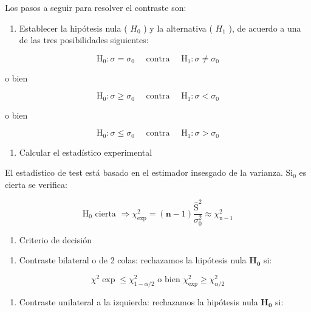 \documentclass[
]{article}
\providecommand{\tightlist}{%
  \setlength{\itemsep}{0pt}\setlength{\parskip}{0pt}}
\begin{document}
Los pasos a seguir para resolver el contraste son:

\begin{enumerate}
\def\labelenumi{\arabic{enumi})}
\tightlist
\item
  Establecer la hipótesis nula ( \(H_{0}\) ) y la alternativa ( \(H_{1}\) ), de acuerdo a una de las tres posibilidades siguientes:
\end{enumerate}

\[
\mathrm{H}_{0}: \sigma=\sigma_{0} \quad \text { contra } \quad \mathrm{H}_{1}: \sigma \neq \sigma_{0}
\]

o bien

\[
\mathrm{H}_{0}: \sigma \geq \sigma_{0} \quad \text { contra } \quad \mathrm{H}_{1}: \sigma<\sigma_{0}
\]

o bien

\[
\mathrm{H}_{0}: \sigma \leq \sigma_{0} \quad \text { contra } \quad \mathrm{H}_{1}: \sigma>\sigma_{0}
\]

\begin{enumerate}
\def\labelenumi{\arabic{enumi})}
\setcounter{enumi}{1}
\tightlist
\item
  Calcular el estadístico experimental
\end{enumerate}

El estadístico de test está basado en el estimador insesgado de la varianza. \(\mathrm{Si}_{0}\) es cierta se verifica:

\[
\mathrm{H}_{0} \text { cierta } \Rightarrow \chi_{\exp }^{2}=(\mathbf{n}-1) \frac{\hat{\mathrm{S}}^{2}}{\sigma_{0}^{2}} \approx \chi_{\mathrm{n}-1}^{2}
\]

\begin{enumerate}
\def\labelenumi{\arabic{enumi})}
\setcounter{enumi}{2}
\tightlist
\item
  Criterio de decisión
\end{enumerate}

\begin{enumerate}
\def\labelenumi{\alph{enumi})}
\tightlist
\item
  Contraste bilateral o de 2 colas: rechazamos la hipótesis nula \(\mathbf{H}_{\mathbf{0}}\) si:
\end{enumerate}

\[
\chi^{2} \exp \leq \chi_{1-\alpha / 2}^{2} \text { o bien } \chi_{\exp }^{2} \geq \chi_{\alpha / 2}^{2}
\]

\begin{enumerate}
\def\labelenumi{\alph{enumi})}
\setcounter{enumi}{1}
\tightlist
\item
  Contraste unilateral a la izquierda: rechazamos la hipótesis nula \(\mathbf{H}_{\mathbf{0}}\) si:
\end{enumerate}
\end{document}
